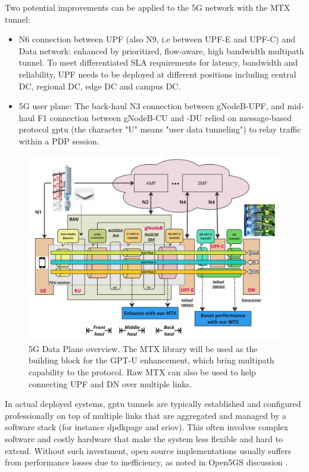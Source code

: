 Two potential improvements can be applied to the 5G network with the MTX tunnel:
\begin{itemize}
    \item N6 connection between UPF (also N9, i.e between UPF-E and UPF-C) and Data network: enhanced by prioritized, flow-aware, high bandwidth multipath tunnel. 
	To meet differentiated SLA requirements for latency, bandwidth and reliability, UPF needs to be deployed at different positions including central DC, regional DC, edge DC and campus DC. 
    \item 5G user plane:  
	The back-haul N3 connection between gNodeB-UPF, and mid-haul F1 connection between gNodeB-CU and -DU relied on message-based protocol \ac{gptu} (the character "U" means "user data tunneling") to relay traffic within a PDP session.
\end{itemize}

\begin{figure}[H]
	\centering
	\includegraphics[width=1.0\textwidth]{resources/images/5g_dp_enhancement.PNG}
	\caption{5G Data Plane overview. The MTX library will be used as the building block for the GPT-U enhancement, which bring multipath capability to the protocol. Raw MTX can also be used to help connecting UPF and DN over multiple links.}
    \label{fig:related_work:5g_dp_enhancement}
\end{figure}

In actual deployed systems, \ac{gptu} tunnels are typically established and configured professionally on top of multiple links that are aggregated and managed by a software stack (for instance \ac{dpdkpage} and \ac{sriov}).
This often involves complex software and costly hardware that make the system less flexible and hard to extend.
Without such investment, open source implementations usually suffers from performance losses due to inefficiency, as noted in Open5GS discussion \cite{open5gs_github_udp_perf_cap}\cite{open5gs_github_dpdk}.
\\

